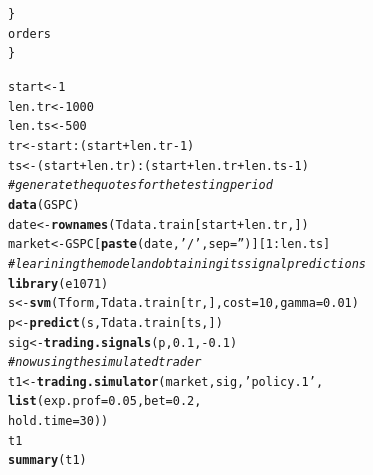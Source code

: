\documentclass{article}\usepackage[]{graphicx}\usepackage[]{color}
\makeatletter
\newcommand{\hlnum}[1]{\textcolor[rgb]{0.686,0.059,0.569}{#1}}%
\newcommand{\hlstr}[1]{\textcolor[rgb]{0.192,0.494,0.8}{#1}}%
\newcommand{\hlcom}[1]{\textcolor[rgb]{0.678,0.584,0.686}{\textit{#1}}}%
\newcommand{\hlopt}[1]{\textcolor[rgb]{0,0,0}{#1}}%
\newcommand{\hlstd}[1]{\textcolor[rgb]{0.345,0.345,0.345}{#1}}%
\newcommand{\hlkwb}[1]{\textcolor[rgb]{0.69,0.353,0.396}{#1}}%
\newcommand{\hlkwc}[1]{\textcolor[rgb]{0.333,0.667,0.333}{#1}}%
\newcommand{\hlkwd}[1]{\textcolor[rgb]{0.737,0.353,0.396}{\textbf{#1}}}%
\newenvironment{kframe}{%
 \def\at@end@of@kframe{}%
 \ifinner\ifhmode%
  \def\at@end@of@kframe{\end{minipage}}%
  \begin{minipage}{\columnwidth}%
 \fi\fi%
 \def\FrameCommand##1{\hskip\@totalleftmargin \hskip-\fboxsep
 \colorbox{shadecolor}{##1}\hskip-\fboxsep
     \hskip-\linewidth \hskip-\@totalleftmargin \hskip\columnwidth}%
 \MakeFramed {\advance\hsize-\width
   \@totalleftmargin\z@ \linewidth\hsize
   \@setminipage}}%
 {\par\unskip\endMakeFramed%
 \at@end@of@kframe}
\newenvironment{knitrout}{}{} %
\makeatother
\begin{document}
\begin{CJK*}{UTF8}{gkai}
\begin{knitrout}
\begin{kframe}
\begin{alltt}
  \hlstd{\}}
  \hlstd{orders}
\hlstd{\}}
\end{alltt}
\end{kframe}
\end{knitrout}
\begin{knitrout}
\color{fgcolor}\begin{kframe}
\begin{alltt}
\hlstd{start} \hlkwb{<-} \hlnum{1}
\hlstd{len.tr} \hlkwb{<-} \hlnum{1000}
\hlstd{len.ts} \hlkwb{<-} \hlnum{500}
\hlstd{tr} \hlkwb{<-} \hlstd{start}\hlopt{:}\hlstd{(start}\hlopt{+}\hlstd{len.tr}\hlopt{-}\hlnum{1}\hlstd{)}
\hlstd{ts} \hlkwb{<-} \hlstd{(start} \hlopt{+} \hlstd{len.tr)}\hlopt{:}\hlstd{(start}\hlopt{+}\hlstd{len.tr}\hlopt{+}\hlstd{len.ts}\hlopt{-}\hlnum{1}\hlstd{)}
\hlcom{#generate the quotes for the testing period}
\hlkwd{data}\hlstd{(GSPC)}
\hlstd{date} \hlkwb{<-} \hlkwd{rownames}\hlstd{(Tdata.train[start}\hlopt{+}\hlstd{len.tr, ])}
\hlstd{market} \hlkwb{<-} \hlstd{GSPC[}\hlkwd{paste}\hlstd{(date,} \hlstr{'/'}\hlstd{,} \hlkwc{sep} \hlstd{=} \hlstr{''}\hlstd{)][}\hlnum{1}\hlopt{:}\hlstd{len.ts]}
\hlcom{#learining the model and obtaining its signal predictions}
\hlkwd{library}\hlstd{(e1071)}
\hlstd{s} \hlkwb{<-} \hlkwd{svm}\hlstd{(Tform, Tdata.train[tr, ],} \hlkwc{cost} \hlstd{=} \hlnum{10}\hlstd{,} \hlkwc{gamma} \hlstd{=} \hlnum{0.01}\hlstd{)}
\hlstd{p} \hlkwb{<-} \hlkwd{predict}\hlstd{(s, Tdata.train[ts, ])}
\hlstd{sig} \hlkwb{<-} \hlkwd{trading.signals}\hlstd{(p,} \hlnum{0.1}\hlstd{,} \hlopt{-}\hlnum{0.1}\hlstd{)}
\hlcom{#now using the simulated trader}
\hlstd{t1} \hlkwb{<-} \hlkwd{trading.simulator}\hlstd{(market, sig,} \hlstr{'policy.1'}\hlstd{,}
                      \hlkwd{list}\hlstd{(}\hlkwc{exp.prof} \hlstd{=} \hlnum{0.05}\hlstd{,} \hlkwc{bet} \hlstd{=} \hlnum{0.2}\hlstd{,}
                           \hlkwc{hold.time} \hlstd{=} \hlnum{30}\hlstd{))}
\hlstd{t1}
\hlkwd{summary}\hlstd{(t1)}
\end{alltt}
\end{kframe}
\end{knitrout}


\end{CJK*}
\end{document}
